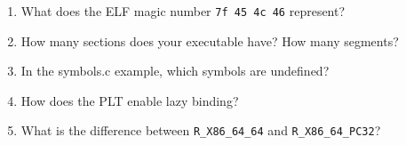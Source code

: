 \begin{enumerate}
\item What does the ELF magic number \texttt{7f 45 4c 46} represent?
\item How many sections does your executable have? How many segments?
\item In the symbols.c example, which symbols are undefined?
\item How does the PLT enable lazy binding?
\item What is the difference between \texttt{R\_X86\_64\_64} and \texttt{R\_X86\_64\_PC32}?
\end{enumerate}
